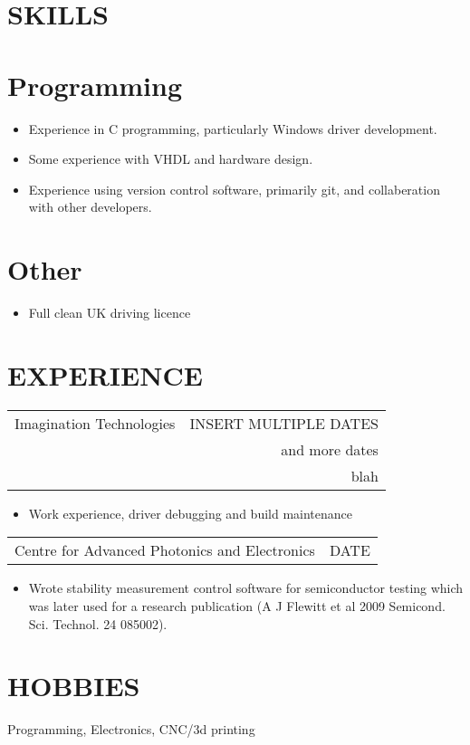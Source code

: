 \documentclass[margin]{res}
\begin{document}
\begin{resume}
\section{SKILLS} 

\normalsize{\section{Programming}}
	\begin{itemize} \itemsep -2pt
		\item Experience in C programming, particularly Windows driver development.
		\item Some experience with VHDL and hardware design.
		\item Experience using version control software, primarily git, and 
				collaberation with other developers.
	\end{itemize}

\normalsize{\section{Other}} 
                  \begin{itemize} \itemsep -2pt
                  \item Full clean UK driving licence 
                  \end{itemize} 
 
\section{EXPERIENCE}      
                  \begin{tabular}{p{3in} r} %
                  Imagination Technologies &  INSERT MULTIPLE DATES \\
                  & and more dates\\
                  & blah
                  \end{tabular}	
                   \begin{itemize} %
                    \item[] Work experience, driver debugging and build maintenance 
		   \end{itemize} 
		 \begin{tabular}{p{3in} r}
                  Centre for Advanced Photonics and Electronics & DATE
                 \end{tabular}	
		  \begin{itemize}
                   \item[] Wrote stability measurement control software for semiconductor testing which
                   was later used for a research publication (A J Flewitt et al 2009 Semicond. Sci. Technol. 24 085002).
                  \end{itemize}
                
 
\section{HOBBIES}         Programming, Electronics, CNC/3d printing 
 
\end{resume} 
\end{document}
